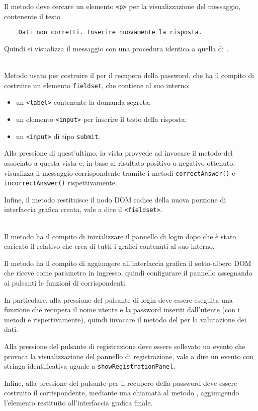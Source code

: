 \begin{description}
	Il metodo deve cercare un elemento \verb'<p>' per la visualizzazione del messaggio, contenente il testo
\begin{verbatim}
	Dati non corretti. Inserire nuovamente la risposta.
\end{verbatim}
	
	Quindi si visualizza il messaggio con una procedura identica a quella di .
	
	\item{}\\
	Metodo usato per costruire il  per il recupero della password, che ha il compito di costruire un elemento \verb'fieldset', che contiene al suo interno:
	\begin{itemize}
	  \item[] un \verb'<label>' contenente la domanda segreta;
	  \item[] un elemento \verb'<input>' per inserire il testo della risposta;
	  \item[] un \verb'<input>' di tipo \verb'submit'.
	\end{itemize}
Alla pressione di quest'ultimo, la vista provvede ad invocare il metodo  del  associato a questa vista e, in base al risultato positivo o negativo ottenuto, visualizza il messaggio corrispondente tramite i metodi \verb'correctAnswer()' e \verb'incorrectAnswer()' rispettivamente.

Infine, il metodo restituisce il nodo DOM radice della nuova porzione di interfaccia grafica creata, vale a dire il \verb'<fieldset>'.

	\item{}\\
	Il metodo ha il compito di inizializzare il pannello di login dopo che è stato caricato il relativo  che crea di tutti i  grafici contenuti al suo interno.
	
	Il metodo ha il compito di aggiungere all'interfaccia grafica il sotto-albero DOM che riceve come parametro in ingresso, quindi configurare il pannello assegnando ai pulsanti le funzioni di  corrispondenti.
	
	In particolare, alla pressione del pulsante di login deve essere eseguita una funzione che recupera il nome utente e la password inseriti dall'utente (con i metodi  e  rispettivamente), quindi invocare il metodo  del  per la valutazione dei dati.
	
	Alla pressione del pulsante di registrazione deve essere sollevato un evento che provoca la visualizzazione del pannello di registrazione, vale a dire un evento con stringa identificativa uguale a \verb'showRegistrationPanel'.
	
	Infine, alla pressione del pulsante per il recupero della password deve essere costruito il  corrispondente, mediante una chiamata al metodo , aggiungendo l'elemento restituito all'interfaccia grafica finale.
\end{description}

